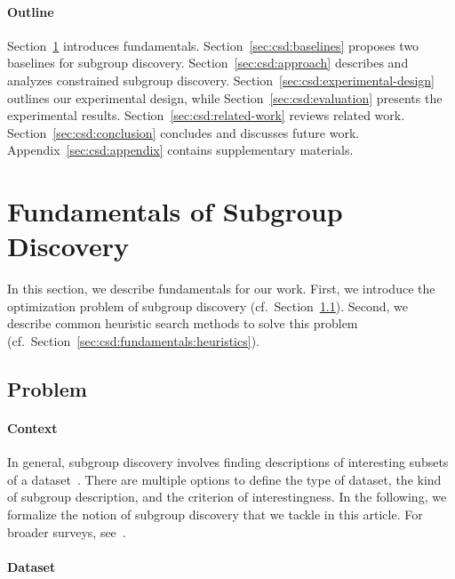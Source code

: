 \documentclass{article}
\theoremstyle{definition}
\begin{document}
\paragraph{Outline}

Section~\ref{sec:csd:fundamentals} introduces fundamentals.
Section~\ref{sec:csd:baselines} proposes two baselines for subgroup discovery.
Section~\ref{sec:csd:approach} describes and analyzes constrained subgroup discovery.
Section~\ref{sec:csd:experimental-design} outlines our experimental design, while Section~\ref{sec:csd:evaluation} presents the experimental results.
Section~\ref{sec:csd:related-work} reviews related work.
Section~\ref{sec:csd:conclusion} concludes and discusses future work.
Appendix~\ref{sec:csd:appendix} contains supplementary materials.

\section{Fundamentals of Subgroup Discovery}
\label{sec:csd:fundamentals}

In this section, we describe fundamentals for our work.
First, we introduce the optimization problem of subgroup discovery (cf.~Section~\ref{sec:csd:fundamentals:problem}).
Second, we describe common heuristic search methods to solve this problem (cf.~Section~\ref{sec:csd:fundamentals:heuristics}).

\subsection{Problem}
\label{sec:csd:fundamentals:problem}

\paragraph{Context}

In general, subgroup discovery involves finding descriptions of interesting subsets of a dataset~\cite{atzmueller2015subgroup}.
There are multiple options to define the type of dataset, the kind of subgroup description, and the criterion of interestingness.
In the following, we formalize the notion of subgroup discovery that we tackle in this article.
For broader surveys, see~\cite{atzmueller2015subgroup, helal2016subgroup, herrera2011overview, ventura2018subgroup}.

\paragraph{Dataset}
\end{document}
